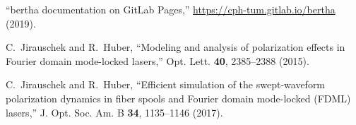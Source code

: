 \documentclass[@CLASSOPTIONS@]{tumarticle}
\begin{document}
\begin{thebibliography}{10}
  \enquote{bertha documentation on {GitLab} {Pages},}
  \url{https://cph-tum.gitlab.io/bertha} (2019).

  C.~Jirauschek and R.~Huber, \enquote{Modeling and analysis of polarization
    effects in {F}ourier domain mode-locked lasers,} Opt. Lett. \textbf{40},
  2385--2388 (2015).

  C.~Jirauschek and R.~Huber, \enquote{Efficient simulation of the
  swept-waveform polarization dynamics in fiber spools and {F}ourier
  domain mode-locked
  {(FDML)} lasers,} J. Opt. Soc. Am. B \textbf{34}, 1135--1146 (2017).

\end{thebibliography}
\end{document}

